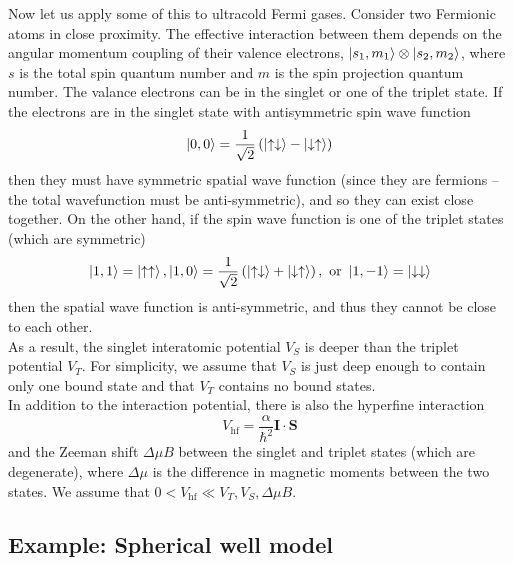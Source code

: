 \documentclass{book}
\theoremstyle{definition}
\newcommand{\al}{\alpha}
\newcommand{\f}[2]{\frac{#1}{#2}}
\newcommand{\lp}{\left(}
\newcommand{\rp}{\right)}
\begin{document}
Now let us apply some of this to ultracold Fermi gases. Consider two Fermionic atoms in close proximity. The effective interaction between them depends on the angular momentum coupling of their valence electrons, $\ket{s_1,m_1}\otimes \ket{s_2,m_2}$, where $s$ is the total spin quantum number and $m$ is the spin projection quantum number. The valance electrons can be in the singlet or one of the triplet state. If the electrons are in the singlet state with antisymmetric spin wave function 
\begin{equation*}
\ket{0,0} = \f{1}{\sqrt{2}}\lp \ket{\uparrow\downarrow} - \ket{\downarrow \uparrow} \rp
\end{equation*}
then they must have symmetric spatial wave function (since they are fermions -- the total wavefunction must be anti-symmetric), and so they can exist close together. On the other hand, if the spin wave function is one of the triplet states (which are symmetric) 
\begin{equation*}
\ket{1,1} = \ket{\uparrow\uparrow}, \ket{1,0} = \f{1}{\sqrt{2}} \lp \ket{\uparrow\downarrow} + \ket{\downarrow\uparrow} \rp, \text{ or } \ket{1,-1} = \ket{\downarrow\downarrow}
\end{equation*}
then the spatial wave function is anti-symmetric, and thus they cannot be close to each other. \\


As a result, the singlet interatomic potential $V_S$ is deeper than the triplet potential $V_T$. For simplicity, we assume that $V_S$ is just deep enough to contain only one bound state and that $V_T$ contains no bound states.\\


In addition to the interaction potential, there is also the hyperfine interaction
\begin{equation*}
V_\text{hf} = \f{\al}{\hbar^2} \mathbf{I}\cdot \mathbf{S}
\end{equation*}
and the Zeeman shift $\Delta \mu B$ between the singlet and triplet states (which are degenerate), where $\Delta \mu$ is the difference in magnetic moments between the two states. We assume that $0< V_\text{hf} \ll V_T,V_S,\Delta \mu B$. 


\subsection*{Example: Spherical well model}
\end{document}
